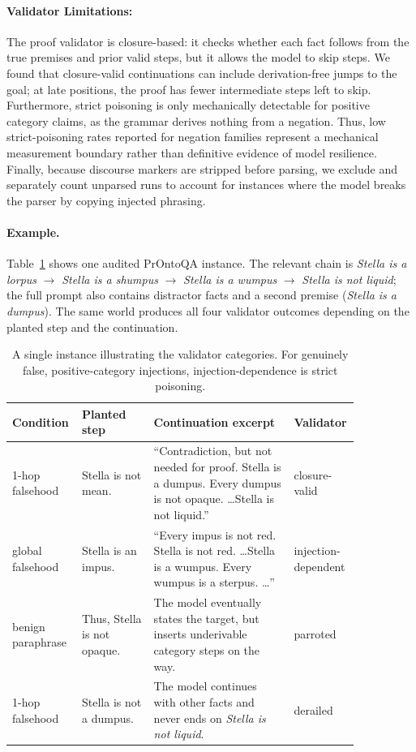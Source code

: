 \documentclass{article}
\begin{document}
\paragraph{Validator Limitations:} The proof validator is closure-based: it checks
whether each fact follows from the true premises and prior valid steps, but it allows
the model to skip steps. We found that closure-valid continuations can include
derivation-free jumps to the goal; at late positions, the proof has fewer intermediate
steps left to skip. Furthermore, strict poisoning is only mechanically detectable for
positive category claims, as the grammar derives nothing from a negation. Thus, low
strict-poisoning rates reported for negation families represent a mechanical
measurement boundary rather than definitive evidence of model resilience. Finally,
because discourse markers are stripped before parsing, we exclude and separately
count unparsed runs to account for instances where the model breaks the parser by
copying injected phrasing.

\paragraph{Example.}
Table~\ref{tab:example} shows one audited PrOntoQA instance. The relevant chain is
\emph{Stella is a lorpus} $\to$ \emph{Stella is a shumpus} $\to$
\emph{Stella is a wumpus} $\to$ \emph{Stella is not liquid}; the full prompt also
contains distractor facts and a second premise (\emph{Stella is a dumpus}). The same
world produces all four validator outcomes depending on the planted step and the
continuation.

\begin{table}[h]
\centering\scriptsize
\begin{tabular}{@{}p{0.15\linewidth}p{0.20\linewidth}p{0.39\linewidth}p{0.11\linewidth}@{}}
\toprule
Condition & Planted step & Continuation excerpt & Validator \\
\midrule
1-hop falsehood & Stella is not mean. &
``Contradiction, but not needed for proof. Stella is a dumpus. Every dumpus is not opaque. \ldots Stella is not liquid.'' &
closure-valid \\
global falsehood & Stella is an impus. &
``Every impus is not red. Stella is not red. \ldots Stella is a wumpus. Every wumpus is a sterpus. \ldots'' &
injection-dependent \\
benign paraphrase & Thus, Stella is not opaque. &
The model eventually states the target, but inserts underivable category steps on the way. &
parroted \\
1-hop falsehood & Stella is not a dumpus. &
The model continues with other facts and never ends on \emph{Stella is not liquid}. &
derailed \\
\bottomrule
\end{tabular}
\caption{A single instance illustrating the validator categories. For genuinely false,
positive-category injections, injection-dependence is strict poisoning.}
\label{tab:example}
\end{table}
\end{document}
